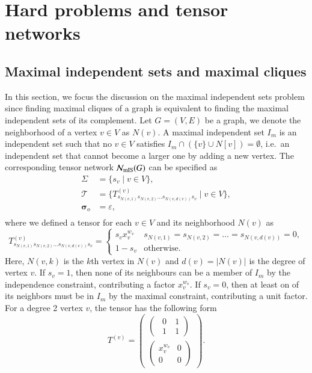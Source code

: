 \documentclass[review, onefignum, onetabnum]{siamart190516}
\begin{document}
\section{Hard problems and tensor networks}\label{sec:otherproblems}
\subsection{Maximal independent sets and maximal cliques}\label{sec:maximal}
In this section, we focus the discussion on the maximal independent sets problem since finding maximal cliques of a graph is equivalent to finding the maximal independent sets of its complement.
Let $G=(V,E)$ be a graph, we denote the neighborhood of a vertex $v\in V$ as $N(v)$.
A maximal independent set $I_m$ is an independent set such that no $v \in V$ satisfies $I_m \cap (\{v\} \cup N[v])  = \emptyset$, i.e.\ an independent set that cannot become a larger one by adding a new vertex.
The corresponding tensor network $\mathcal{N}_{\rm mIS}(G)$ can be specified as
\begin{equation}\label{eq:maxistensornetwork}
\begin{split}
    \Sigma &= \{s_v \mid v \in V\},\\
    \mathcal{T} &= \{T^{(v)}_{s_{N(v,1)} s_{N(v, 2)}\ldots s_{N(v,d(v))}s_v} \mid v\in V\},\\
    \boldsymbol{\sigma}_o &= \varepsilon,\\
\end{split}
\end{equation}
where we defined a tensor for each $v \in V$ and its neighborhood $N(v)$ as
\begin{equation}\label{eq:maximal}
    T^{(v)}_{s_{N(v, 1)}s_{N(v, 2)}\ldots s_{N(v, d(v))}s_v} = \begin{cases}
        s_vx_v^{w_v} & s_{N(v, 1)}=s_{N(v, 2)}=\ldots=s_{N(v, d(v))}=0,\\
        1-s_v& \text{otherwise}.
    \end{cases}
\end{equation}
Here, $N(v, k)$ is the $k$th vertex in $N(v)$ and $d(v) = |N(v)|$ is the degree of vertex $v$.
If $s_v = 1$, then none of its neighbours can be a member of $I_{m}$ by the independence constraint, contributing a factor $x_v^{w_v}$.
If $s_v = 0$, then at least on of its neighbors must be in $I_{m}$ by the maximal constraint, contributing a unit factor.
For a degree 2 vertex $v$, the tensor has the following form
\begin{equation}
    T^{(v)}=\left(\begin{matrix}
    \left(\begin{matrix}
        ~~0 &~1 \\
        ~~1 &~1
    \end{matrix}\right)\\
    \left(\begin{matrix}
        x_v^{w_v} &0 \\
        0 &0
    \end{matrix}\right)
    \end{matrix}\right).
\end{equation}
\end{document}
